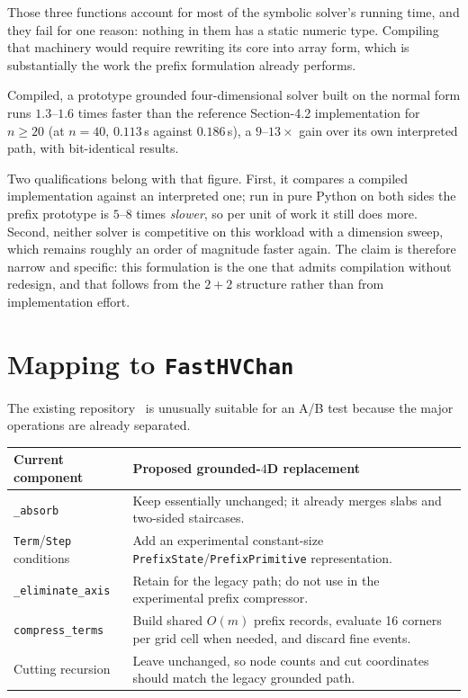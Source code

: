 \documentclass[12pt,a4paper]{article}
\theoremstyle{definition}
\newcommand{\1}{\mathbf 1}
\begin{document}
Those three functions account for most of the symbolic solver's running time,
and they fail for one reason: nothing in them has a static numeric type.
Compiling that machinery would require rewriting its core into array form, which
is substantially the work the prefix formulation already performs.

Compiled, a prototype grounded four-dimensional solver built on the normal form
runs $1.3$--$1.6$ times faster than the reference Section-4.2 implementation for
$n\ge20$ (at $n=40$, $0.113$\,s against $0.186$\,s), a $9$--$13\times$ gain over
its own interpreted path, with bit-identical results.

Two qualifications belong with that figure. First, it compares a compiled
implementation against an interpreted one; run in pure Python on both sides the
prefix prototype is $5$--$8$ times \emph{slower}, so per unit of work it still
does more. Second, neither solver is competitive on this workload with a
dimension sweep, which remains roughly an order of magnitude faster again. The
claim is therefore narrow and specific: this formulation is the one that admits
compilation without redesign, and that follows from the $2+2$ structure rather
than from implementation effort.


\section{Mapping to \texttt{FastHVChan}}

The existing repository~\cite{FastHVChan} is unusually suitable for an A/B test because the major operations are already separated.

\begin{center}
\begin{tabular}{>{\raggedright\arraybackslash}p{} >{\raggedright\arraybackslash}p{}}
\toprule
Current component & Proposed grounded-$4$D replacement \\
\midrule
\texttt{\_absorb} & Keep essentially unchanged; it already merges slabs and two-sided staircases. \\
\texttt{Term}/\texttt{Step} conditions & Add an experimental constant-size \texttt{PrefixState}/\texttt{PrefixPrimitive} representation. \\
\texttt{\_eliminate\_axis} & Retain for the legacy path; do not use in the experimental prefix compressor. \\
\texttt{compress\_terms} & Build shared $O(m)$ prefix records, evaluate 16 corners per grid cell when needed, and discard fine events. \\
Cutting recursion & Leave unchanged, so node counts and cut coordinates should match the legacy grounded path. \\
\bottomrule
\end{tabular}
\end{center}
\end{document}
